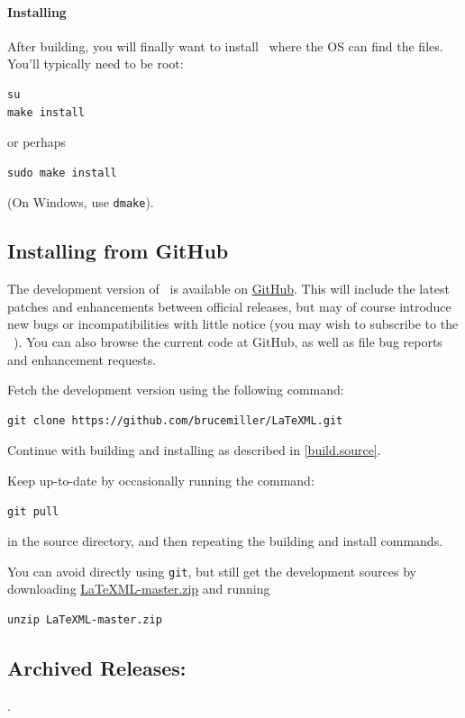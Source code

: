 \documentclass{article}
\begin{document}
\paragraph{Installing}\label{install.source}
After building, you will finally want to install \LaTeXML\ where the OS can find the files.  
You'll typically need to be root:
\begin{lstlisting}[style=shell]
su
make install
\end{lstlisting}
or perhaps
\begin{lstlisting}[style=shell]
sudo make install
\end{lstlisting}
(On Windows, use \texttt{dmake}).

\subsection{Installing from GitHub}\label{install.github}
The development version of \LaTeXML\ is available on  \href{https://github.com}{GitHub}.
This will include the latest patches and enhancements between official releases,
but may of course introduce new bugs or incompatibilities with little notice
(you may wish to subscribe to the \LaTeXML\ ).
You can also browse the current code at GitHub, as well as file bug reports and enhancement requests.

Fetch the development version using the following command:
\begin{lstlisting}[style=shell]
git clone https://github.com/brucemiller/LaTeXML.git
\end{lstlisting}
Continue with building and installing as described in \ref{build.source}.

Keep up-to-date by occasionally running the command:
\begin{lstlisting}[style=shell]
git pull
\end{lstlisting}
in the source directory, and then repeating the building and install commands.

You can avoid directly using \texttt{git}, but still get the development sources
by downloading
\href{https://github.com/brucemiller/LaTeXML/archive/master.zip}{LaTeXML-master.zip}
and running
\begin{lstlisting}[style=shell]
unzip LaTeXML-master.zip
\end{lstlisting}

\subsection{Archived Releases:}\label{archive}
\AllReleases.
\end{document}
